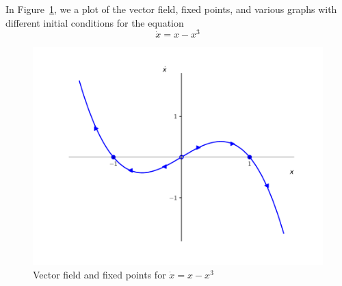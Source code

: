 
In Figure~\ref{fig2_2_3vecfield}, we a plot of the vector field, fixed points,
and various graphs with different initial conditions for the equation 
\[
    \dot{x} = x - x^3
\]
\begin{figure}[!ht]
    \includegraphics[scale=0.6, center]{../plots/ch02/ex2_2_3.pdf}
    \caption{Vector field and fixed points for $\dot{x} = x - x^3$\label{fig2_2_3vecfield}}
\end{figure}
